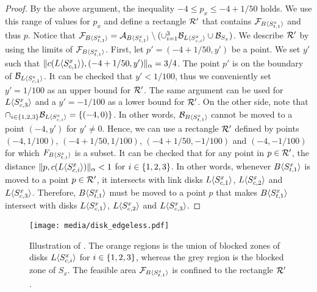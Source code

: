 \begin{toappendix}
\begin{toappendix}
\begin{proof}
    By the above argument, the inequality $-4 \le p_x \le -4+1/50$ holds. 
    We use this range of values for $p_x$ and define a rectangle $\mathcal{R}'$ that contains $\mathcal{F}_{B\langle S_{t,1}^x\rangle}$ and thus $p$.
    Notice that $\mathcal{F}_{B\langle S_{t,1}^x\rangle} = \mathcal{A}_{B\langle S_{t,1}^x\rangle} \setminus (\cup_{i=1}^3 \mathcal{B}_{L\langle S^x_{c,i}\rangle} \cup \mathcal{B}_{S_x})$. %
    We describe $\mathcal{R}'$ by using the limits of $\mathcal{F}_{B\langle S_{t,1}^x\rangle}$. 
    First, let $p' = (-4+1/50,y')$ be a point. 
    We set $y'$ such that $\lVert c(L\langle S^x_{c,1}\rangle),(-4+1/50,y')\rVert_\alpha = 3/4$.
    The point $p'$ is on the boundary of $\mathcal{B}_{L\langle S^x_{c,1}\rangle}$.
    It can be checked that $y' < 1/100$, thus we conveniently set $y' = 1/100$ as an upper bound for $\mathcal{R}'$.
    The same argument can be used for $L\langle S^x_{c,3}\rangle$ and a $y' = -1/100$ as a lower bound for $\mathcal{R}'$.
    On the other side, note that $\cap_{i \in \{1,2,3\}} \mathcal{B}_{L\langle S^x_{c,i}\rangle} = \{(-4,0)\}$. 
    In other words, $\mathcal{B}_{B\langle S^x_{t,1}\rangle}$ cannot be moved to a point $(-4,y')$ for $y' \neq 0$.
    Hence, we can use a rectangle $\mathcal{R}'$ defined by points $(-4,1/100)$, $(-4+1/50,1/100)$, $(-4+1/50,-1/100)$ and $(-4,-1/100)$ for which $F_{B\langle S^x_{t,1}\rangle}$ is a subset.
    It can be checked that for any point in $p \in \mathcal{R}'$, the distance $\lVert p,c(L\langle S^x_{c,i}\rangle)\rVert_\alpha < 1$ for $i \in \{1,2,3\}$.
    In other words, whenever $B\langle S_{t,1}^x\rangle$ is moved to a point $p \in \mathcal{R}'$, it intersects with link disks $L\langle S^x_{c,1}\rangle$, $L\langle S^x_{c,2}\rangle$ and $L\langle S^x_{c,3}\rangle$.
    Therefore, $B\langle S^x_{t,1}\rangle$ must be moved to a point $p$ that makes $B\langle S^x_{t,1}\rangle$ intersect with disks $L\langle S^x_{c,1}\rangle$, $L\langle S^x_{c,2}\rangle$ and $L\langle S^x_{c,3}\rangle$.
\end{proof}

\begin{figure}[bt]
    \centering
    \texttt{[image: media/disk\_edgeless.pdf]}
    \caption{Illustration of . The orange regions is the union of blocked zones of disks $L\langle S^x_{c,i}\rangle$ for $i\in \{1,2,3\}$, whereas the grey region is the blocked zone of $S_x$. The feasible area $\mathcal{F}_{B\langle S^x_{t,1}\rangle}$ is confined to the rectangle $\mathcal{R}'$.}
    \label{fig:block_disk_restricted}
\end{figure} 



\end{toappendix}
\end{toappendix}
